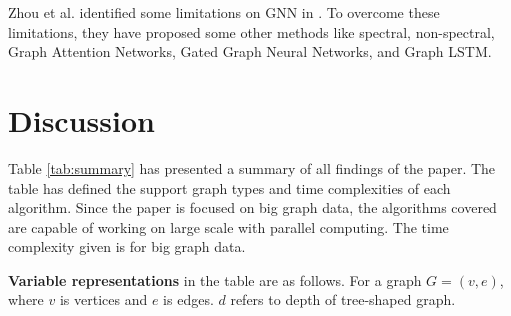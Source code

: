 \documentclass[journal,twoside,web]{ieeecolor}
\begin{document}
Zhou et al. identified some limitations on GNN in \cite{60}. To overcome these limitations, they have proposed some other methods like spectral, non-spectral, Graph Attention Networks, Gated Graph Neural Networks, and Graph LSTM. 

\section{Discussion}
Table \ref{tab:summary} has presented a summary of all findings of the paper. The table has defined the support graph types and time complexities of each algorithm. Since the paper is focused on big graph data, the algorithms covered are capable of working on large scale with parallel computing. The time complexity given is for big graph data.

\textbf{Variable representations} in the table are as follows. For a graph $G=(v, e)$, where $v$ is vertices and $e$ is edges. $d$ refers to depth of tree-shaped graph.
\end{document}
